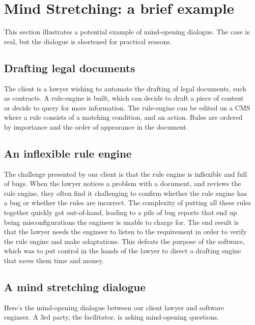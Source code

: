 \section{Mind Stretching: a brief example}

This section illustrates a potential example of mind-opening dialogue.
The case is real, but the dialogue is shortened for practical reasons.

\subsection{Drafting legal documents}

The client is a lawyer wishing to automate the drafting of legal documents, such as contracts.
A rule-engine is built, which can decide to draft a piece of content or decide to query for more information.
The rule-engine can be edited on a CMS where a rule consists of a matching condition, and an action.
Rules are ordered by importance and the order of appearance in the document.

\subsection{An inflexible rule engine}

The challenge presented by our client is that the rule engine is inflexible and full of bugs.
When the lawyer notices a problem with a document, and reviews the rule engine, they often find it challenging to
confirm whether the rule engine has a bug or whether the rules are incorrect.
The complexity of putting all these rules together quickly got out-of-hand, leading to a pile of bug reports that end
up being misconfigurations the engineer is unable to charge for.
The end result is that the lawyer needs the engineer to listen to the requirement in order to verify the rule engine
and make adaptations.
This defeats the purpose of the software, which was to put control in the hands of the lawyer to direct a drafting
engine that saves them time and money.

\subsection{A mind stretching dialogue}

Here's the mind-opening dialogue between our client lawyer and software engineer.
A 3rd party, the facilitator, is asking mind-opening questions.

